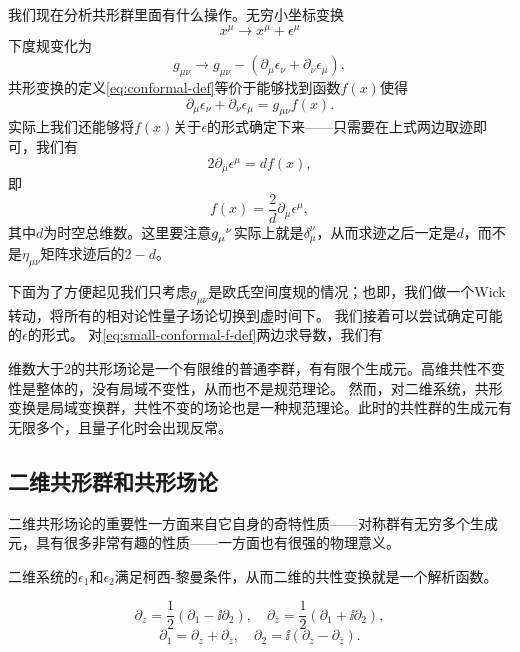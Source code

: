 我们现在分析共形群里面有什么操作。无穷小坐标变换
\[
    x^\mu \longrightarrow x^\mu + \epsilon^\mu
\]
下度规变化为
\begin{equation}
    g_{\mu \nu} \longrightarrow g_{\mu \nu} - (\partial_\mu \epsilon_\nu + \partial_\nu \epsilon_\mu),
\end{equation}
共形变换的定义\eqref{eq:conformal-def}等价于能够找到函数$f(x)$使得
\begin{equation}
    \partial_\mu \epsilon_\nu + \partial_\nu \epsilon_\mu = g_{\mu \nu} f(x).
    \label{eq:small-conformal-f-def}
\end{equation}
实际上我们还能够将$f(x)$关于$\epsilon$的形式确定下来——只需要在上式两边取迹即可，我们有
\[
    2 \partial_\mu \epsilon^\mu = d f(x),
\]
即
\begin{equation}
    f(x) = \frac{2}{d} \partial_\mu \epsilon^\mu,
\end{equation}
其中$d$为时空总维数。这里要注意$g\indices{_\mu^\nu}$实际上就是$\delta_\mu^\nu$，从而求迹之后一定是$d$，而不是$\eta_{\mu \nu}$矩阵求迹后的$2-d$。

下面为了方便起见我们只考虑$g_{\mu \nu}$是欧氏空间度规的情况；也即，我们做一个Wick转动，将所有的相对论性量子场论切换到虚时间下。
我们接着可以尝试确定可能的$\epsilon$的形式。
对\eqref{eq:small-conformal-f-def}两边求导数，我们有


维数大于2的共形场论是一个有限维的普通李群，有有限个生成元。高维共性不变性是整体的，没有局域不变性，从而也不是规范理论。
然而，对二维系统，共形变换是局域变换群，共性不变的场论也是一种规范理论。此时的共性群的生成元有无限多个，且量子化时会出现反常。

\subsection{二维共形群和共形场论}

二维共形场论的重要性一方面来自它自身的奇特性质——对称群有无穷多个生成元，具有很多非常有趣的性质——一方面也有很强的物理意义。

二维系统的$\epsilon_1$和$\epsilon_2$满足柯西-黎曼条件，从而二维的共性变换就是一个解析函数。

\begin{equation}
    \partial_z = \frac{1}{2} (\partial_1 - \ii \partial_2), \quad \partial_{\bar{z}} = \frac{1}{2} (\partial_1 + \ii \partial_2),
\end{equation}
\begin{equation}
    \partial_1 = \partial_z + \partial_{\bar{z}}, \quad \partial_2 = \ii (\partial_z - \partial_{\bar{z}}).
\end{equation}

